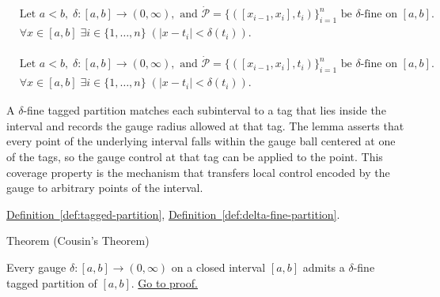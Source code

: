 \begin{remark*}
\[
\begin{aligned}
&\text{Let } a<b,\; \delta:[a,b]\to(0,\infty), \text{ and } \dot{\mathcal{P}}=\{([x_{i-1},x_i],t_i)\}_{i=1}^n \text{ be }\delta\text{-fine on }[a,b].\\
&\forall x\in[a,b]\;\exists i\in\{1,\ldots,n\}\;(|x-t_i|<\delta(t_i)).
\end{aligned}
\]
\end{remark*}

\begin{remark*}
\[
\begin{aligned}
&\text{Let } a<b,\; \delta:[a,b]\to(0,\infty), \text{ and } \dot{\mathcal{P}}=\{([x_{i-1},x_i],t_i)\}_{i=1}^n \text{ be }\delta\text{-fine on }[a,b].\\
&\forall x\in[a,b]\;\exists i\in\{1,\ldots,n\}\;(|x-t_i|<\delta(t_i)).
\end{aligned}
\]
\end{remark*}

\begin{remark*}[Interpretation]
A $\delta$-fine tagged partition matches each subinterval to a tag that lies inside the interval and records the gauge radius allowed at that tag. The lemma asserts that every point of the underlying interval falls within the gauge ball centered at one of the tags, so the gauge control at that tag can be applied to the point. This coverage property is the mechanism that transfers local control encoded by the gauge to arbitrary points of the interval.
\end{remark*}

\begin{dependencies}
\hyperref[def:tagged-partition]{Definition~\ref*{def:tagged-partition}},
\hyperref[def:delta-fine-partition]{Definition~\ref*{def:delta-fine-partition}}.
\end{dependencies}


\begin{theorembox}{Theorem (Cousin's Theorem)}
\begin{theorem}
\label{thm:cousins-theorem}
Every gauge $\delta:[a,b]\to(0,\infty)$ on a closed interval $[a,b]$
admits a $\delta$-fine tagged partition of $[a,b]$.
\hyperref[prf:cousins-theorem]{Go to proof.}
\end{theorem}
\end{theorembox}

